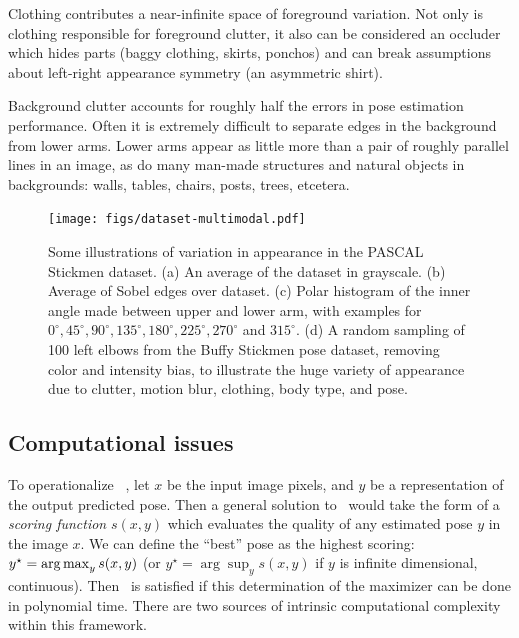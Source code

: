  Clothing contributes a near-infinite space of foreground 
variation.  Not only is clothing responsible for foreground clutter, it also 
can be considered an occluder which hides parts (\eg baggy clothing, skirts, 
ponchos) and can break assumptions about left-right appearance symmetry (\eg an 
asymmetric shirt).

 Background clutter accounts for roughly half the 
errors in pose estimation performance. Often it is extremely difficult to 
separate edges in the background from lower arms.  Lower arms appear as little 
more than a pair of roughly parallel lines in an image, as do many man-made 
structures and natural objects in backgrounds: walls, tables, chairs, posts, 
trees, etcetera.

\begin{figure}[tb]
\begin{center}
\texttt{[image: figs/dataset-multimodal.pdf]}
\caption[Variations in appearance]{Some illustrations of variation in 
appearance in the PASCAL Stickmen dataset.  (a) An average of the dataset in 
grayscale.  (b) Average of Sobel edges over dataset.  (c) Polar histogram of 
the inner angle made between upper and lower arm, with examples for 
$0^\circ,45^\circ,90^\circ,135^\circ,180^\circ,225^\circ,270^\circ$ and 
$315^\circ$. (d) A random sampling of 100 left elbows from the Buffy Stickmen 
pose dataset,	removing color and intensity bias, to illustrate the huge variety 
of appearance due to	clutter, motion blur, clothing, body type, and pose.  
\label{fig:dataset-multimodal}}
\end{center}
\end{figure}



\subsection{Computational issues}

To operationalize ~, let $x$ be the input image pixels, and $y$ 
be a representation of the output predicted pose.  Then a general solution 
to~ would take the form of a {\em scoring function} $s(x,y)$ 
which evaluates the quality of any estimated pose $y$ in the image $x$.  We can 
define the ``best'' pose as the highest scoring: $y^\star = \mathop{\arg\max}_y s(x,y)$ 
(or $y^\star = \arg\sup_y s(x,y)$ if $y$ is infinite dimensional, \eg 
continuous).  Then~ is satisfied if this determination of the 
maximizer can be done in polynomial time. There are two sources of intrinsic 
computational complexity within this framework. 

